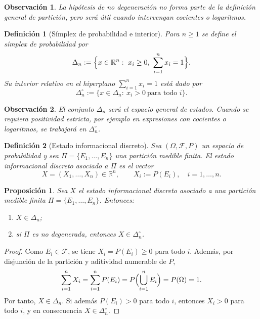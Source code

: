 ﻿\documentclass[12pt]{article}
\newtheorem{definicion}{Definición}[section]
\newtheorem{proposicion}{Proposición}[section]
\newtheorem{observacion}{Observación}[section]
\begin{document}
\begin{observacion}
La hipótesis de no degeneración no forma parte de la definición general de partición, pero será útil cuando intervengan cocientes o logaritmos.
\end{observacion}

\begin{definicion}[Símplex de probabilidad e interior]\label{def:simplex}
Para $n\ge 1$ se define el \emph{símplex de probabilidad} por
\[
\Delta_n:=\Bigl\{x\in\mathbb R^n:\ x_i\ge 0,\ \sum_{i=1}^n x_i=1\Bigr\}.
\]
Su interior relativo en el hiperplano $\sum_{i=1}^n x_i=1$ está dado por
\[
\Delta_n^\circ:=\{x\in\Delta_n:\ x_i>0\ \text{para todo } i\}.
\]
\end{definicion}

\begin{observacion}
El conjunto $\Delta_n$ será el espacio general de estados. Cuando se requiera positividad estricta, por ejemplo en expresiones con cocientes o logaritmos, se trabajará en $\Delta_n^\circ$.
\end{observacion}

\begin{definicion}[Estado informacional discreto]\label{def:estado}
Sea $(\Omega,\mathcal F,P)$ un espacio de probabilidad y sea $\Pi=\{E_1,\dots,E_n\}$ una partición medible finita. El \emph{estado informacional discreto} asociado a $\Pi$ es el vector
\[
X=(X_1,\dots,X_n)\in\mathbb R^n,
\qquad
X_i:=P(E_i),\quad i=1,\dots,n.
\]
\end{definicion}

\begin{proposicion}\label{prop:estado_simplex}
Sea $X$ el estado informacional discreto asociado a una partición medible finita $\Pi=\{E_1,\dots,E_n\}$.
Entonces:
\begin{enumerate}
    \item $X\in\Delta_n$;
    \item si $\Pi$ es no degenerada, entonces $X\in\Delta_n^\circ$.
\end{enumerate}
\end{proposicion}

\begin{proof}
Como $E_i\in\mathcal F$, se tiene $X_i=P(E_i)\ge 0$ para todo $i$. Además, por disjunción de la partición y aditividad numerable de $P$,
\[
\sum_{i=1}^n X_i
=
\sum_{i=1}^n P(E_i)
=
P\Bigl(\bigcup_{i=1}^n E_i\Bigr)
=
P(\Omega)
=
1.
\]
Por tanto, $X\in\Delta_n$. Si además $P(E_i)>0$ para todo $i$, entonces $X_i>0$ para todo $i$, y en consecuencia $X\in\Delta_n^\circ$.
\end{proof}
\end{document}
